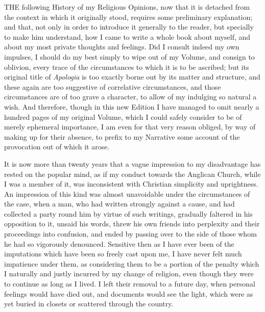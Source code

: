 



THE
following History of my Religious Opinions, now that it is detached
from the context in which it originally stood, requires some
preliminary explanation; and that, not only in order to introduce it
generally to the reader, but specially to make him understand, how I
came to write a whole book about myself, and about my most private
thoughts and feelings. Did I consult indeed my own impulses, I should
do my best simply to wipe out of my Volume, and consign to oblivion,
every trace of the circumstances to which it is to be ascribed; but
its original title of \emph{Apologia} is too exactly borne out by its
matter and structure, and these again are too suggestive of
correlative circumstances, and those circumstances are of too grave a
character, to allow of my indulging so natural a wish. And therefore,
though in this new Edition I have managed to omit nearly a hundred
pages of my original Volume, which I could safely consider to be
of merely ephemeral importance, I am even for that very reason
obliged, by way of making up for their absence, to prefix to my
Narrative some account of the provocation out of which it arose.


It is now more than twenty years that a vague
impression to my disadvantage has rested on the popular mind, as if my
conduct towards the Anglican Church, while I was a member of it, was
inconsistent with Christian simplicity and uprightness. An impression
of this kind was almost unavoidable under the circumstances of the
case, when a man, who had written strongly against a cause, and had
collected a party round him by virtue of such writings, gradually
faltered in his opposition to it, unsaid his words, threw his own
friends into perplexity and their proceedings into confusion, and
ended by passing over to the side of those whom he had so vigorously
denounced. Sensitive then as I have ever been of the imputations which
have been so freely cast upon me, I have never felt much impatience
under them, as considering them to be a portion of the penalty which I
naturally and justly incurred by my change of religion, even though
they were to continue as long as I lived. I left their removal to a
future day, when personal feelings would have died out, and documents
would see the light, which were as yet buried in closets or scattered
through the country.


